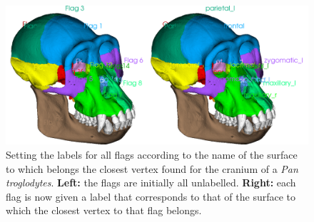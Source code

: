 \begin{figure}
  \centering
  \includegraphics[scale=0.31]{images/10/edit_flag_label_closest_vertex.png} 
	\caption{Setting the labels for all flags according to the name of the surface to which belongs the closest  vertex found for the cranium of a \textit{Pan troglodytes}.  \textbf{Left:} the flags are initially all  unlabelled. \textbf{Right:} each flag is now given a label that corresponds to that of the surface to which the closest vertex to that flag belongs.}
\label{flag_label_closest_vertex}
\end{figure}


